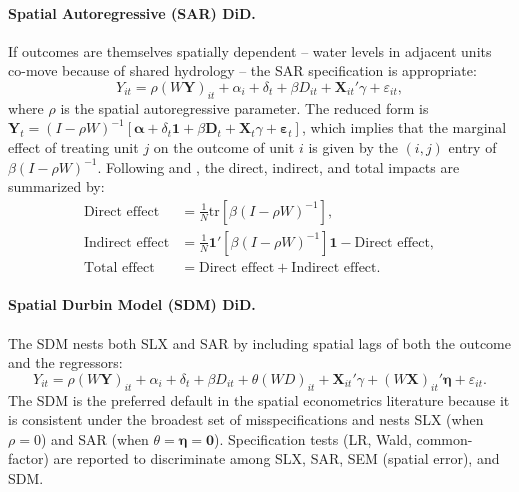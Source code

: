 \documentclass[11pt, letterpaper]{article}
\begin{document}
\paragraph{Spatial Autoregressive (SAR) DiD.} If outcomes are themselves spatially dependent -- water levels in adjacent units co-move because of shared hydrology -- the SAR specification is appropriate:
\begin{equation}
Y_{it} = \rho (W\mathbf{Y})_{it} + \alpha_i + \delta_t + \beta D_{it} + \mathbf{X}_{it}'\gamma + \varepsilon_{it},
\label{eq:sar}
\end{equation}
where $\rho$ is the spatial autoregressive parameter. The reduced form is $\mathbf{Y}_t = (I - \rho W)^{-1}[\boldsymbol{\alpha} + \delta_t \mathbf{1} + \beta \mathbf{D}_t + \mathbf{X}_t \gamma + \boldsymbol{\varepsilon}_t]$, which implies that the marginal effect of treating unit $j$ on the outcome of unit $i$ is given by the $(i,j)$ entry of $\beta (I - \rho W)^{-1}$. Following \citet{lesage2014interpretation} and \citet{lesage2009introduction}, the direct, indirect, and total impacts are summarized by:
\begin{align}
\text{Direct effect} &= \tfrac{1}{N} \text{tr}\!\left[\beta (I - \rho W)^{-1}\right], \label{eq:directeffect}\\
\text{Indirect effect} &= \tfrac{1}{N} \mathbf{1}'\!\left[\beta (I - \rho W)^{-1}\right]\!\mathbf{1} - \text{Direct effect}, \label{eq:indirecteffect}\\
\text{Total effect} &= \text{Direct effect} + \text{Indirect effect}. \label{eq:totaleffect}
\end{align}

\paragraph{Spatial Durbin Model (SDM) DiD.} The SDM nests both SLX and SAR by including spatial lags of both the outcome and the regressors:
\begin{equation}
Y_{it} = \rho (W\mathbf{Y})_{it} + \alpha_i + \delta_t + \beta D_{it} + \theta (WD)_{it} + \mathbf{X}_{it}'\gamma + (W\mathbf{X})_{it}'\boldsymbol{\eta} + \varepsilon_{it}.
\label{eq:sdm}
\end{equation}
The SDM is the preferred default in the spatial econometrics literature \citep{elhorst2010applied,lesage2009introduction} because it is consistent under the broadest set of misspecifications and nests SLX (when $\rho=0$) and SAR (when $\theta=\boldsymbol{\eta}=\mathbf{0}$). Specification tests (LR, Wald, common-factor) are reported to discriminate among SLX, SAR, SEM (spatial error), and SDM.
\end{document}
